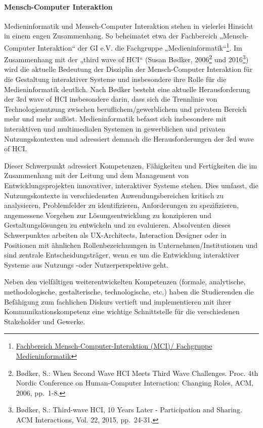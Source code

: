 \paragraph{Mensch-Computer
Interaktion}\label{mensch-computer-interaktion}

Medieninformatik und Mensch-Computer Interaktion stehen in vielerlei
Hinsicht in einem engen Zusammenhang. So beheimatet etwa der Fachbereich
„Mensch-Computer Interaktion`` der GI e.V. die Fachgruppe
„Medieninformatik``\footnote{\href{http://fb-mci.gi.de/mensch-computer-interaktion-mci/fachgruppen/medieninformatik.html}{Fachbereich
  Mensch-Computer-Interaktion (MCI)/ Fachgruppe Medieninformatik}}. Im
Zusammenhang mit der „third wave of HCI`` (Susan Bødker, 2006\footnote{Bødker,
  S.: When Second Wave HCI Meets Third Wave Challenges. Proc. 4th Nordic
  Conference on Human-Computer Interaction: Changing Roles, ACM, 2006,
  pp.~1-8.} und 2016\footnote{Bødker, S.: Third-wave HCI, 10 Years Later
  - Participation and Sharing. ACM Interactions, Vol. 22, 2015,
  pp.~24-31.}) wird die aktuelle Bedeutung der Disziplin der
Mensch-Computer Interaktion für die Gestaltung interaktiver Systeme und
insbesondere ihre Rolle für die Medieninformatik deutlich. Nach Bødker
besteht eine aktuelle Herausforderung der 3rd wave of HCI insbesondere
darin, dass sich die Trennlinie von Technologienutzung zwischen
beruflichem/gewerblichem und privatem Bereich mehr und mehr auflöst.
Medieninformatik befasst sich insbesondere mit interaktiven und
multimedialen Systemen in gewerblichen und privaten Nutzungskontexten
und adressiert demnach die Herausforderungen der 3rd wave of HCI.

Dieser Schwerpunkt adressiert Kompetenzen, Fähigkeiten und Fertigkeiten
die im Zusammenhang mit der Leitung und dem Management von
Entwicklungsprojekten innovativer, interaktiver Systeme stehen. Dies
umfasst, die Nutzungskontexte in verschiedensten Anwendungsbereichen
kritisch zu analysieren, Problemfelder zu identifizieren, Anforderungen
zu spezifizieren, angemessene Vorgehen zur Lösungsentwicklung zu
konzipieren und Gestaltungslösungen zu entwickeln und zu evaluieren.
Absolventen dieses Schwerpunktes arbeiten als UX-Architects, Interaction
Designer oder in Positionen mit ähnlichen Rollenbezeichnungen in
Unternehmen/Institutionen und sind zentrale Entscheidungsträger, wenn es
um die Entwicklung interaktiver Systeme aus Nutzungs -oder
Nutzerperspektive geht.

Neben den vielfältigen weiterentwickelten Kompetenzen (formale,
analytische, methodologische, gestalterische, technologische, etc.)
haben die Studierenden die Befähigung zum fachlichen Diskurs vertieft
und implementieren mit ihrer Kommunikationskompetenz eine wichtige
Schnittstelle für die verschiedenen Stakeholder und Gewerke.

